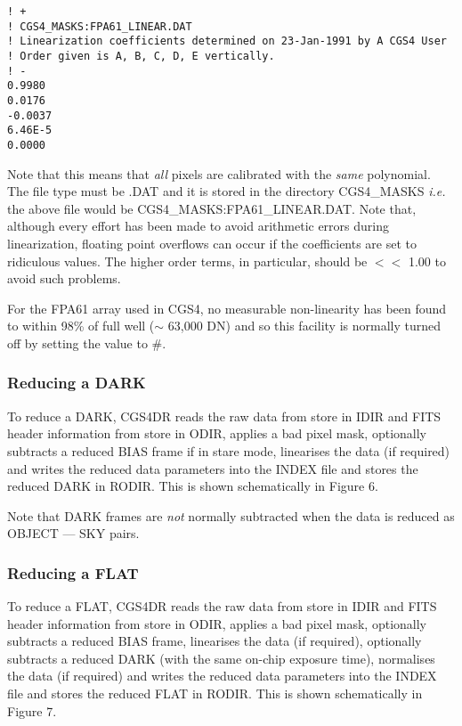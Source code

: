 {\begin{verbatim}
! +
! CGS4_MASKS:FPA61_LINEAR.DAT
! Linearization coefficients determined on 23-Jan-1991 by A CGS4 User
! Order given is A, B, C, D, E vertically.
! -
0.9980
0.0176
-0.0037
6.46E-5
0.0000
\end{verbatim}

Note that this means that {\em all} pixels are calibrated with the {\em same}
polynomial. The file type must be {\sf .DAT} and it is stored in the
directory {\sf CGS4\_MASKS} {\em i.e.} the above file would be 
{\sf CGS4\_MASKS:FPA61\_LINEAR.DAT}. Note that, although every effort has been 
made to avoid arithmetic errors during linearization, floating point overflows 
can occur if the coefficients are set to ridiculous values. The higher order 
terms, in particular, should be $<<$ 1.00 to avoid such problems.

For the FPA61 array used in CGS4, no measurable non-linearity has been
found to within 98\% of full well ($\sim$ 63,000 DN) and so this facility
is normally turned off by setting the value to {\sf \#}.

\subsubsection{Reducing a DARK}
\label{reducing_a_dark}

To reduce a {\sf DARK}, CGS4DR reads the raw data from store in IDIR and FITS 
header information from store in ODIR, applies a bad pixel mask, optionally 
subtracts a reduced {\sf BIAS} frame if in stare mode, linearises the data 
(if required) and writes the reduced data parameters into the INDEX file and 
stores the reduced {\sf DARK} in RODIR.  This is shown schematically in 
Figure 6.

Note that {\sf DARK} frames are {\em not} normally subtracted when the data
is reduced as {\sf OBJECT --- SKY} pairs.

\subsubsection{Reducing a FLAT}
\label{reducing_a_flat}

To reduce a {\sf FLAT}, CGS4DR reads the raw data from store in IDIR and 
FITS header information from store in ODIR, applies a bad pixel mask, 
optionally subtracts a reduced {\sf BIAS} frame, linearises the data (if 
required), optionally subtracts a reduced {\sf DARK} (with the  same on-chip 
exposure time), normalises the data (if required) and writes the reduced 
data parameters into the INDEX file and stores the reduced {\sf FLAT} in RODIR. 
This is shown schematically in Figure 7.

}

